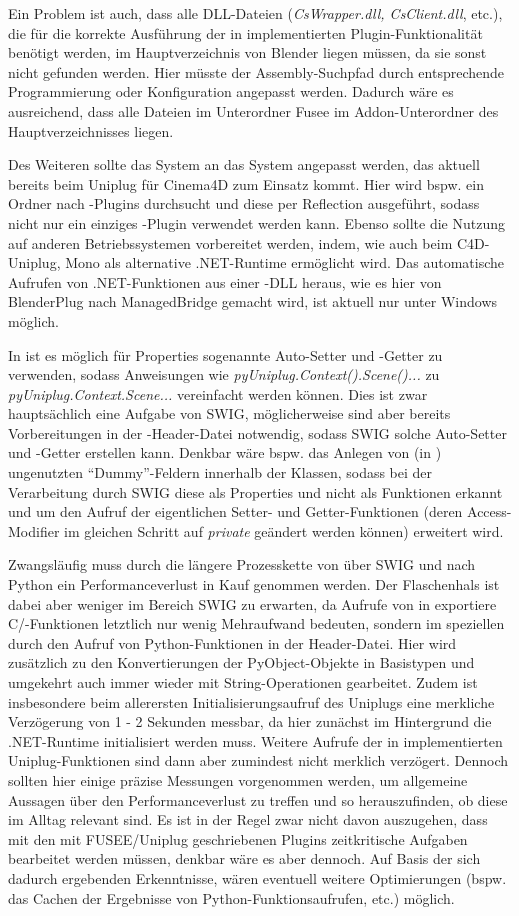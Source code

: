 Ein Problem ist auch, dass alle DLL-Dateien (\emph{CsWrapper.dll, CsClient.dll}, etc.), die für die korrekte Ausführung der in \CS implementierten Plugin-Funktionalität benötigt werden, im Hauptverzeichnis von Blender liegen müssen, da sie sonst nicht gefunden werden. Hier müsste der Assembly-Suchpfad durch entsprechende Programmierung oder Konfiguration angepasst werden. Dadurch wäre es ausreichend, dass alle Dateien im Unterordner Fusee im Addon-Unterordner des Hauptverzeichnisses liegen.


Des Weiteren sollte das System an das System angepasst werden, das aktuell bereits beim Uniplug für Cinema4D zum Einsatz kommt. Hier wird bspw. ein Ordner nach \CS-Plugins durchsucht und diese per Reflection ausgeführt, sodass nicht nur ein einziges \CS-Plugin verwendet werden kann. Ebenso sollte die Nutzung auf anderen Betriebssystemen vorbereitet werden, indem, wie auch beim C4D-Uniplug, Mono als alternative .NET-Runtime ermöglicht wird. Das automatische Aufrufen von .NET-Funktionen aus einer \CC-DLL heraus, wie es hier von BlenderPlug nach ManagedBridge gemacht wird, ist aktuell nur unter Windows möglich.

In \CS{} ist es möglich für Properties sogenannte Auto-Setter und -Getter zu verwenden, sodass Anweisungen wie \emph{pyUniplug.Context().Scene()...} zu \emph{pyUniplug.Context.Scene...} vereinfacht werden können. Dies ist zwar hauptsächlich eine Aufgabe von SWIG, möglicherweise sind aber bereits Vorbereitungen in der \CC-Header-Datei notwendig, sodass SWIG solche Auto-Setter und -Getter erstellen kann. Denkbar wäre bspw. das Anlegen von (in \CC) ungenutzten \enquote{Dummy}-Feldern innerhalb der Klassen, sodass bei der Verarbeitung durch SWIG diese als Properties und nicht als Funktionen erkannt und um den Aufruf der eigentlichen Setter- und Getter-Funktionen (deren Access-Modifier im gleichen Schritt auf \emph{private} geändert werden können) erweitert wird.

Zwangsläufig muss durch die längere Prozesskette von \CS{} über SWIG und \CC nach Python ein Performanceverlust in Kauf genommen werden. Der Flaschenhals ist dabei aber weniger im Bereich SWIG zu erwarten, da Aufrufe von \CS{} in exportiere C/\CC-Funktionen letztlich nur wenig Mehraufwand bedeuten, sondern im speziellen durch den Aufruf von Python-Funktionen in der Header-Datei. Hier wird zusätzlich zu den Konvertierungen der PyObject-Objekte in Basistypen und umgekehrt auch immer wieder mit String-Operationen gearbeitet. Zudem ist insbesondere beim allerersten Initialisierungsaufruf des Uniplugs eine merkliche Verzögerung von 1 - 2 Sekunden messbar, da hier zunächst im Hintergrund die .NET-Runtime initialisiert werden muss. Weitere Aufrufe der in \CS{} implementierten Uniplug-Funktionen sind dann aber zumindest nicht merklich verzögert. Dennoch sollten hier einige präzise Messungen vorgenommen werden, um allgemeine Aussagen über den Performanceverlust zu treffen und so herauszufinden, ob diese im Alltag relevant sind. Es ist in der Regel zwar nicht davon auszugehen, dass mit den mit FUSEE/Uniplug geschriebenen Plugins zeitkritische Aufgaben bearbeitet werden müssen, denkbar wäre es aber dennoch. Auf Basis der sich dadurch ergebenden Erkenntnisse, wären eventuell weitere Optimierungen (bspw. das Cachen der Ergebnisse von Python-Funktionsaufrufen, etc.) möglich.